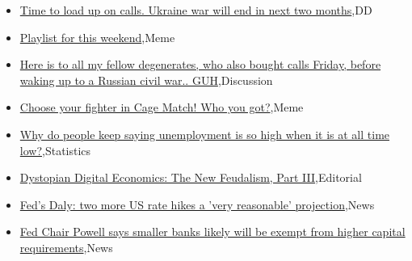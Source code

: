 \documentclass{article}%
\begin{document}
%
\begin{itemize}%
\item%
\href{https://reddit.com/r/wallstreetbets/comments/14hquss/time\_to\_load\_up\_on\_calls\_ukraine\_war\_will\_end\_in/}{Time to load up on calls. Ukraine war will end in next two months},DD%
\item%
\href{https://reddit.com/r/wallstreetbets/comments/14hpnin/playlist\_for\_this\_weekend/}{Playlist for this weekend},Meme%
\item%
\href{https://reddit.com/r/wallstreetbets/comments/14hm6gh/here\_is\_to\_all\_my\_fellow\_degenerates\_who\_also/}{Here is to all my fellow degenerates, who also bought calls Friday, before waking up to a Russian civil war.. GUH},Discussion%
\item%
\href{https://reddit.com/r/StockMarket/comments/14h5yu5/choose\_your\_fighter\_in\_cage\_match\_who\_you\_got/}{Choose your fighter in Cage Match! Who you got?},Meme%
\item%
\href{https://reddit.com/r/Economics/comments/14hk1qv/why\_do\_people\_keep\_saying\_unemployment\_is\_so\_high/}{Why do people keep saying unemployment is so high when it is at all time low?},Statistics%
\item%
\href{https://reddit.com/r/Economics/comments/14h2a84/dystopian\_digital\_economics\_the\_new\_feudalism/}{Dystopian Digital Economics: The New Feudalism, Part III},Editorial%
\item%
\href{https://reddit.com/r/Economics/comments/14h1dp0/feds\_daly\_two\_more\_us\_rate\_hikes\_a\_very/}{Fed's Daly: two more US rate hikes a 'very reasonable' projection},News%
\item%
\href{https://reddit.com/r/Economics/comments/14gvw4k/fed\_chair\_powell\_says\_smaller\_banks\_likely\_will/}{Fed Chair Powell says smaller banks likely will be exempt from higher capital requirements},News%
\end{itemize}%
\end{document}
